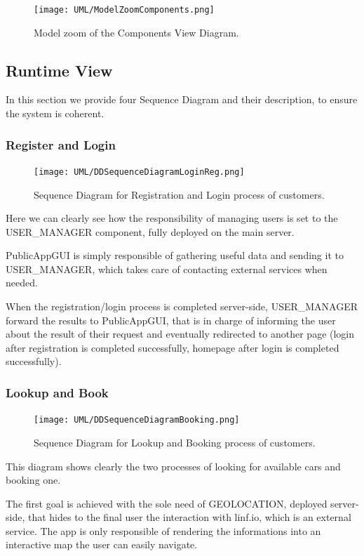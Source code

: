 \documentclass[11pt]{article} %
\begin{document}
\begin{figure}[H]
	\centering
	\texttt{[image: UML/ModelZoomComponents.png]}
	\caption{Model zoom of the Components View Diagram.}
\end{figure}	


\newpage
\subsection{Runtime View}

In this section we provide four Sequence Diagram and their description, to ensure the system is coherent.

\subsubsection{Register and Login}
\begin{figure}[H]
	\centering
	\texttt{[image: UML/DDSequenceDiagramLoginReg.png]}
	\caption{Sequence Diagram for Registration and Login process of customers.	}
\end{figure}	
Here we can clearly see how the responsibility of managing users is set to the USER\_MANAGER component, fully deployed on the main server.

PublicAppGUI is simply responsible of gathering useful data and sending it to USER\_MANAGER, which takes care of contacting external services when needed. 

When the registration/login process is completed server-side, USER\_MANAGER forward the results to PublicAppGUI, that is in charge of informing the user about the result of their request and eventually redirected to another page (login after registration is completed successfully, homepage after login is completed successfully).

\subsubsection{Lookup and Book}
\begin{figure}[H]
	\centering
	\texttt{[image: UML/DDSequenceDiagramBooking.png]}
	\caption{Sequence Diagram for Lookup and Booking process of customers.}
\end{figure}
This diagram shows clearly the two processes of looking for available cars and booking one.

The first goal is achieved with the sole need of GEOLOCATION, deployed server-side, that hides to the final user the interaction with linf.io, which is an external service. The app is only responsible of rendering the informations into an interactive map the user can easily navigate.
\end{document}
